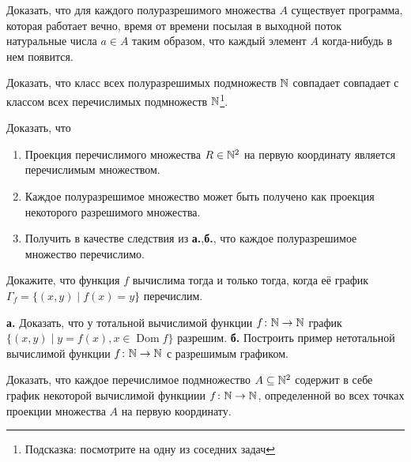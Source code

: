 \documentclass[a4paper, 12pt, num=ТА2]{listok}
\DeclareMathOperator{\Dom}{Dom}
\begin{document}
\begin{problem}
	Доказать, что для каждого полуразрешимого множества $A$ существует программа, которая работает вечно,
	время от времени посылая в выходной поток натуральные числа $a \in A$ таким образом, что каждый элемент $A$ когда-нибудь в нем появится.
\end{problem}
\begin{problem}
	Доказать, что класс всех полуразрешимых подмножеств $\mathbb{N}$ совпадает совпадает с классом всех перечислимых подмножеств $\mathbb{N}$\footnote{%
	Подсказка: посмотрите на одну из соседних задач}.
\end{problem}
\begin{problem}
	Доказать, что
	\begin{enumerate}
		\item Проекция перечислимого множества $R \in \mathbb{N}^2$ на первую координату является перечислимым множеством.
		\item Каждое полуразрешимое множество может быть получено как проекция некоторого разрешимого множества.
		\item Получить в качестве следствия из \textbf{а.},\textbf{б.}, что каждое полуразрешимое множество перечислимо.
	\end{enumerate}
\end{problem}
\begin{problem}
	Докажите, что функция $f$ вычислима тогда и только тогда, когда
	её график $\Gamma_f = \{ (x, y) \mid f(x) = y \}$ перечислим.
\end{problem}
\begin{problem}
	\textbf{а.} Доказать, что у тотальной вычислимой функции $f \colon \mathbb{N} \to \mathbb{N}$ график $\{(x, y) \mid y = f (x), x \in \Dom f\}$ разрешим.
	\textbf{б.} Построить пример нетотальной вычислимой функции $f \colon \mathbb{N} \to \mathbb{N}$ с разрешимым графиком.
\end{problem}
\begin{problem}
	Доказать, что каждое перечислимое подмножество $A \subseteq \mathbb{N}^2$ содержит в себе график некоторой вычислимой функциии $f \colon \mathbb{N} \to \mathbb{N}$,
	определенной во всех точках проекции множества $A$ на первую координату.
\end{problem}
\end{document}
